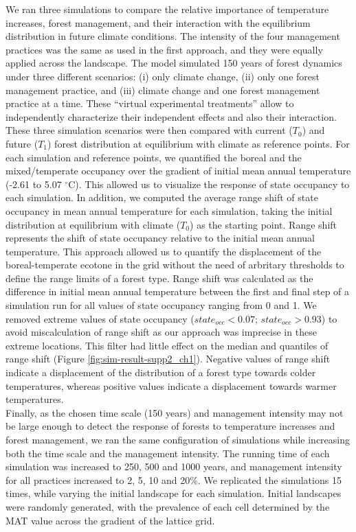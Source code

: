 We ran three simulations to compare the relative importance of
temperature increases, forest management, and their interaction with the
equilibrium distribution in future climate conditions. The intensity of
the four management practices was the same as used in the first
approach, and they were equally applied across the landscape. The model
simulated 150 years of forest dynamics under three different scenarios:
(i) only climate change, (ii) only one forest management practice, and
(iii) climate change and one forest management practice at a time. These
``virtual experimental treatments'' allow to independently characterize
their independent effects and also their interaction. These three
simulation scenarios were then compared with current (\(T_0\)) and
future (\(T_1\)) forest distribution at equilibrium with climate as
reference points. For each simulation and reference points, we
quantified the boreal and the mixed/temperate occupancy over the
gradient of initial mean annual temperature (-2.61 to 5.07
\(^{\circ}\)C). This allowed us to visualize the response of state
occupancy to each simulation. In addition, we computed the average range
shift of state occupancy in mean annual temperature for each simulation,
taking the initial distribution at equilibrium with climate (\(T_0\)) as
the starting point. Range shift represents the shift of state occupancy
relative to the initial mean annual temperature. This approach allowed
us to quantify the displacement of the boreal-temperate ecotone in the
grid without the need of arbritary thresholds to define the range limits
of a forest type. Range shift was calculated as the difference in
initial mean annual temperature between the first and final step of a
simulation run for all values of state occupancy ranging from 0 and 1.
We removed extreme values of state occupancy (\(state_{occ} < 0.07\);
\(state_{occ} > 0.93\)) to avoid miscalculation of range shift as our
approach was imprecise in these extreme locations. This filter had
little effect on the median and quantiles of range shift (Figure \ref{fig:sim-result-supp2_ch1}).
Negative values of range shift indicate a displacement of the
distribution of a forest type towards colder temperatures, whereas
positive values indicate a displacement towards warmer temperatures.\\

Finally, as the chosen time scale (150 years) and management intensity
may not be large enough to detect the response of forests to temperature
increases and forest management, we ran the same configuration of
simulations while increasing both the time scale and the management
intensity. The running time of each simulation was increased to 250, 500
and 1000 years, and management intensity for all practices increased to
2, 5, 10 and 20\%. We replicated the simulations 15 times, while varying
the initial landscape for each simulation. Initial landscapes were
randomly generated, with the prevalence of each cell determined by the
MAT value across the gradient of the lattice grid.\\

